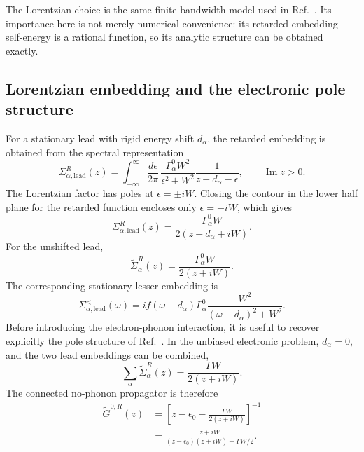 \documentclass[
 reprint,
 superscriptaddress,
 amsmath,amssymb,
 aps,prb,
 longbibliography,
 floatfix
]{revtex4-2}
\newcommand{\lead}{\mathrm{lead}}
\begin{document}
The Lorentzian choice is the same finite-bandwidth model used in Ref.~\cite{MaciejkoWangGuo2006}. Its importance here is not merely numerical convenience: its retarded embedding self-energy is a rational function, so its analytic structure can be obtained exactly.

\subsection{Lorentzian embedding and the electronic pole structure}
\label{sec:lorentzian-poles}

For a stationary lead with rigid energy shift $d_\alpha$, the retarded embedding is obtained from the spectral representation
\begin{equation*}
\Sigma_{\alpha,\lead}^R(z)
=
\int_{-\infty}^{\infty}
\frac{d\epsilon}{2\pi}\,
\frac{
\Gamma_\alpha^0 W^2
}{
\epsilon^2+W^2
}
\frac{1}
{z-d_\alpha-\epsilon},
\qquad
\operatorname{Im}z>0.
\end{equation*}
The Lorentzian factor has poles at $\epsilon=\pm iW$. Closing the contour in the lower half plane for the retarded function encloses only $\epsilon=-iW$, which gives
\begin{equation*}
\Sigma_{\alpha,\lead}^R(z)
=
\frac{
\Gamma_\alpha^0 W
}{
2\left(
z-d_\alpha+iW
\right)
}.
\end{equation*}
For the unshifted lead,
\begin{equation*}
\widetilde\Sigma_\alpha^R(z)
=
\frac{
\Gamma_\alpha^0 W
}{
2(z+iW)
}.
\end{equation*}
The corresponding stationary lesser embedding is
\begin{equation*}
\Sigma_{\alpha,\lead}^<(\omega)
=
i
f(\omega-d_\alpha)
\Gamma_\alpha^0
\frac{W^2}
{(\omega-d_\alpha)^2+W^2}.
\end{equation*}
Before introducing the electron-phonon interaction, it is useful to recover explicitly the pole structure of Ref.~\cite{MaciejkoWangGuo2006}. In the unbiased electronic problem, $d_\alpha=0$, and the two lead embeddings can be combined,
\begin{equation*}
\sum_\alpha
\widetilde\Sigma_\alpha^R(z)
=
\frac{\Gamma W}{2(z+iW)}.
\end{equation*}
The connected no-phonon propagator is therefore
\begin{equation*}
\begin{aligned}
\widetilde G^{0,R}(z)
&=
\left[
z-\epsilon_0
-
\frac{\Gamma W}{2(z+iW)}
\right]^{-1}
\\
&=
\frac{z+iW}
{
(z-\epsilon_0)(z+iW)
-\Gamma W/2
}.
\end{aligned}
\end{equation*}
\end{document}
